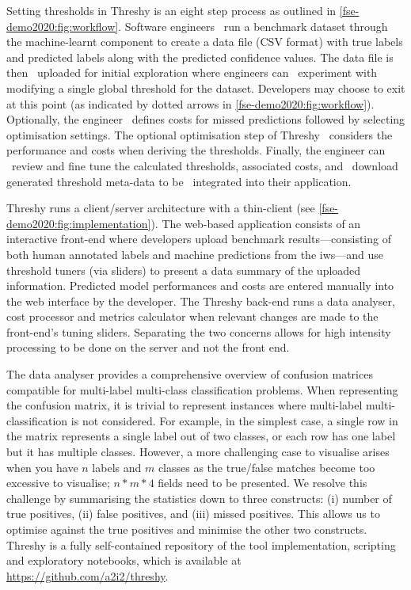 Setting thresholds in Threshy is an eight step process as outlined in \cref{fse-demo2020:fig:workflow}. Software engineers ~run a benchmark dataset through the machine-learnt component to create a data file (CSV format) with true labels and predicted labels along with the predicted confidence values. The data file is then ~uploaded for initial exploration where engineers can ~experiment with modifying a single global threshold for the dataset. Developers may choose to exit at this point (as indicated by dotted arrows in \cref{fse-demo2020:fig:workflow}). Optionally, the engineer ~defines costs for missed predictions followed by selecting optimisation settings. The optional optimisation step of Threshy ~considers the performance and costs when deriving the thresholds. Finally, the engineer can ~review and fine tune the calculated thresholds, associated costs, and ~download generated threshold meta-data to be ~integrated into their application.

Threshy runs a client/server architecture with a thin-client (see \cref{fse-demo2020:fig:implementation}). The web-based application consists of an interactive front-end where developers upload benchmark results---consisting of both human annotated labels and machine predictions from the \gls{iws}---and use threshold tuners (via sliders) to present a data summary of the uploaded information. Predicted model performances and costs are entered manually into the web interface by the developer. The Threshy back-end runs a data analyser, cost processor and metrics calculator when relevant changes are made to the front-end's tuning sliders. Separating the two concerns allows for high intensity processing to be done on the server and not the front end.

The data analyser provides a comprehensive overview of confusion matrices compatible for multi-label multi-class classification problems. When representing the confusion matrix, it is trivial to represent instances where multi-label multi-classification is not considered. For example, in the simplest case, a single row in the matrix represents a single label out of two classes, or each row has one label but it has multiple classes. 	However, a more challenging case to visualise arises when you have $n$ labels and $m$ classes as the true/false matches become too excessive to visualise; $n * m * 4$ fields need to be presented.  We resolve this challenge by summarising the statistics down to three constructs: (i) number of true positives, (ii) false positives, and (iii) missed positives. This allows us to optimise against the true positives and minimise the other two constructs. 
Threshy is a fully self-contained repository of the tool implementation, scripting and exploratory notebooks, which is available at \url{https://github.com/a2i2/threshy}.

